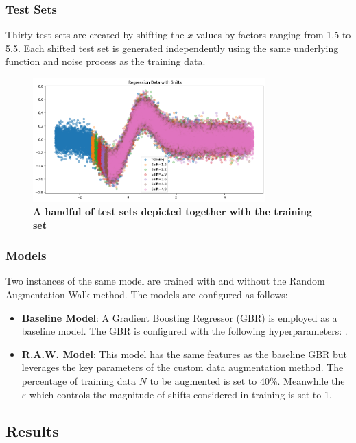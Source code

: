 \subsubsection{Test Sets}
Thirty test sets are created by shifting the $x$ values by factors ranging from 1.5 to 5.5. Each shifted test set is generated independently using the same underlying function and noise process as the training data.
\begin{figure}[H]
    \centering
    \includegraphics[width=0.8\textwidth]{assets/reg_shift_plot.png} 
    \caption{\textbf{A handful of test sets depicted together with the training set}}
    \label{fig:reg-shift-plot}
\end{figure}

\subsubsection{Models}
Two instances of the same model are trained with and without the Random Augmentation Walk method. The models are configured as follows:
\begin{itemize}
    \item \textbf{Baseline Model}: A Gradient Boosting Regressor (GBR) is employed as a baseline model. The GBR is configured with the following hyperparameters: .
    \item \textbf{R.A.W. Model}: This model has the same features as the baseline GBR but leverages the key parameters of the custom data augmentation method. The percentage of training data $N$ to be augmented is set to 40\%. Meanwhile the $\varepsilon$ which controls the magnitude of shifts considered in training is set to 1.
\end{itemize}




\subsection{\textbf{Results}}

